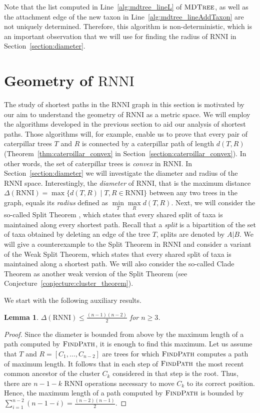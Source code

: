 \documentclass{amsart}
\newcommand{\rnni}{\mathrm{RNNI}}
\newcommand{\findpath}{\textsc{FindPath}}
\newcommand{\mdtree}{\textsc{MDTree}}
\newtheorem{lemma}[definition]{Lemma}
\begin{document}
Note that the list computed in Line~\ref{alg:mdtree_lineL} of $\mdtree$, as well as the attachment edge of the new taxon in Line~\ref{alg:mdtree_lineAddTaxon} are not uniquely determined.
Therefore, this algorithm is non-deterministic, which is an important observation that we will use for finding the radius of $\rnni$ in Section~\ref{section:diameter}.


\section{Geometry of $\rnni$}
\label{section:geometry}

The study of shortest paths in the $\rnni$ graph in this section is motivated by our aim to understand the geometry of $\rnni$ as a metric space.
We will employ the algorithms developed in the previous section to aid our analysis of shortest paths.
Those algorithms will, for example, enable us to prove that every pair of caterpillar trees $T$ and $R$ is connected by a caterpillar path of length $d(T,R)$ (Theorem~\ref{thm:caterpillar_convex} in Section~\ref{section:caterpillar_convex}).
In other words, the set of caterpillar trees is \emph{convex} in $\rnni$.
In Section~\ref{section:diameter} we will investigate the diameter and radius of the $\rnni$ space.
Interestingly, the \emph{diameter} of $\rnni$, that is the maximum distance $\Delta(\rnni) = \max \{d(T, R) \mid T, R \in \rnni\}$ between any two trees in the graph, equals its \emph{radius} defined as $\min\limits_T \max\limits_R d(T,R)$.
Next, we will consider the so-called Split Theorem \autocite{Gavryushkin2018-ol}, which states that every shared split of taxa is maintained along every shortest path.
Recall that a \emph{split} is a bipartition of the set of taxa obtained by deleting an edge of the tree $T$, splits are denoted by $A|B$.
We will give a counterexample to the Split Theorem in $\rnni$ and consider a variant of the Weak Split Theorem, which states that every shared split of taxa is maintained along a shortest path.
We will also consider the so-called Clade Theorem as another weak version of the Split Theorem (see Conjecture~\ref{conjecture:cluster_theorem}).

We start with the following auxiliary results.

\begin{lemma}
$\Delta(\rnni) \leq \frac{(n-1)(n-2)}{2}$ for $n \geq 3$.
\label{lemma:diameter_bound}
\end{lemma}

\begin{proof}
Since the diameter is bounded from above by the maximum length of a path computed by $\findpath$, it is enough to find this maximum.
Let us assume that $T$ and $R = [C_1, \ldots, C_{n-2}]$ are trees for which $\findpath$ computes a path of maximum length.
It follows that in each step of $\findpath$ the most recent common ancestor of the cluster $C_k$ considered in that step is the root.
Thus, there are $n-1-k$ $\rnni$ operations necessary to move $C_k$ to its correct position.
Hence, the maximum length of a path computed by $\findpath$ is bounded by $\sum\limits_{i = 1}^{n-2} (n-1-i) = \frac{(n-2)(n-1)}{2}$.
\end{proof}
\end{document}
